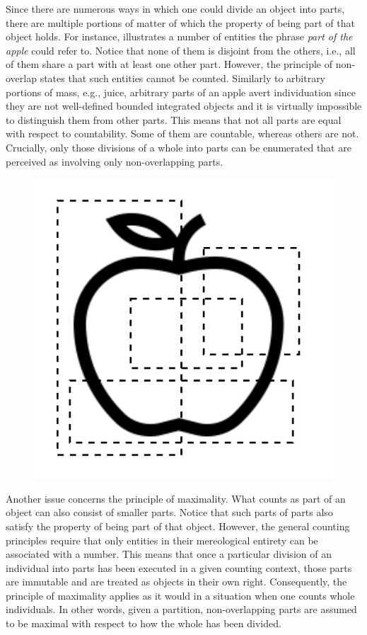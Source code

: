 Since there are numerous ways in which one could divide an object into parts, there are multiple portions of matter of which the property of being part of that object holds. For instance,  illustrates a number of entities the phrase \textit{part of the apple} could refer to. Notice that none of them is disjoint from the others, i.e., all of them share a part with at least one other part. However, the principle of non-overlap states that such entities cannot be counted. Similarly to arbitrary portions of mass, e.g., juice, arbitrary parts of an apple avert individuation since they are not well-defined bounded integrated objects and it is virtually impossible to distinguish them from other parts. This means that not all parts are equal with respect to countability. Some of them are countable, whereas others are not. Crucially, only those divisions of a whole into parts can be enumerated that are perceived as involving only non-overlapping parts.

\begin{figure}[h!]
\centering
\includegraphics[scale=0.5]{figures/apple_overlap.png}
\label{fig:overlapping-parts}
\end{figure}

Another issue concerns the principle of maximality. What counts as part of an object can also consist of smaller parts. Notice that such parts of parts also satisfy the property of being part of that object. However, the general counting principles require that only entities in their mereological entirety can be associated with a number. This means that once a particular division of an individual into parts has been executed in a given counting context, those parts are immutable and are treated as objects in their own right. Consequently, the principle of maximality applies as it would in a situation when one counts whole individuals. In other words, given a partition, non-overlapping parts are assumed to be maximal with respect to how the whole has been divided.

